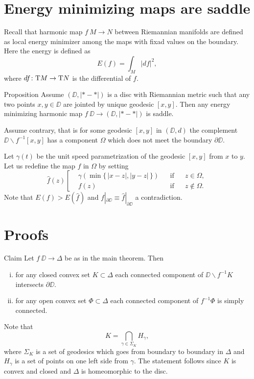 \documentclass{article}
\begin{document}
\section{Energy minimizing maps are saddle}

Recall that harmonic map $f\:M\to N$ between Riemannian manifolds are defined as local energy minimizer among the maps with fixad values on the boundary.
Here the energy is defined as 
\[E(f)=\int_M|df|^2,\]
where $df\colon\mathrm{T} M\to \mathrm{T} N$ is the differential of $f$.

\begin{thm}{Proposition} 
Assume $(\DD,|{*}-{*}|)$ is a disc with Riemannian metric such that any two points $x,y\in\DD$ are jointed by unique geodesic $[x,y]$.
Then any energy minimizing harmonic map $f\:\DD\to(\DD,|{*}-{*}|)$ is saddle.
\end{thm}

Assume contrary, that is for some geodesic $[x,y]$ in $(\DD,d)$ the complement $\DD\backslash f^{-1}[x,y]$ has a component $\Omega$ which does not meet the boundary $\partial\DD$.

Let $\gamma(t)$ be the unit speed parametrization of the geodesic $[x,y]$ from $x$ to $y$.
Let us redefine the map $f$ in $\Omega$ by setting 
\[\hat f(z)\left[
\begin{aligned}
&\gamma(\min\{\,|x-z|,|y-z|\,\})&&\text{if}&& z\in\Omega,
\\
&f(z)&&\text{if}&& z\notin\Omega.
\end{aligned}
\right.\]
Note that $E(f)>E(\hat f)$ and $f|_{\partial \DD}\equiv \hat f|_{\partial \DD}$ a contradiction.
\qeds


\section{Proofs}

\begin{thm}{Claim}\label{claim}
Let $f\:\DD\to \Delta$ be as in the main theorem.
Then 
\begin{enumerate}[(i)]
\item for any closed convex set $K\subset\Delta$ each connected component of $\DD\backslash f^{-1}K$ intersects $\partial\DD$.
\item for any open convex set $\Phi\subset\Delta$ each connected component of $f^{-1}\Phi$ is simply connected.
\end{enumerate}
\end{thm}

Note that 
\[K=\bigcap_{\gamma\in\Sigma_K} H_\gamma,\]
where $\Sigma_K$ is a set of geodesics which goes from boundary to boundary in $\Delta$
and $H_\gamma$ is a set of points on one left side from $\gamma$.
The statement follows since $K$ is convex and closed and $\Delta$ is homeomorphic to the disc.
\end{document}
